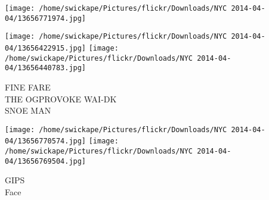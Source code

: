\documentclass[10pt,letterpaper]{article}
\begin{document}
\texttt{[image: /home/swickape/Pictures/flickr/Downloads/NYC 2014-04-04/13656771974.jpg]}

\vspace{0.25in}
\texttt{[image: /home/swickape/Pictures/flickr/Downloads/NYC 2014-04-04/13656422915.jpg]}
\texttt{[image: /home/swickape/Pictures/flickr/Downloads/NYC 2014-04-04/13656440783.jpg]}

FINE FARE\\
THE OGPROVOKE WAI{-}DK\\
SNOE MAN\\
\pagebreak

\texttt{[image: /home/swickape/Pictures/flickr/Downloads/NYC 2014-04-04/13656770574.jpg]}
\texttt{[image: /home/swickape/Pictures/flickr/Downloads/NYC 2014-04-04/13656769504.jpg]}

GIPS\\
Face\\
\pagebreak
\end{document}
